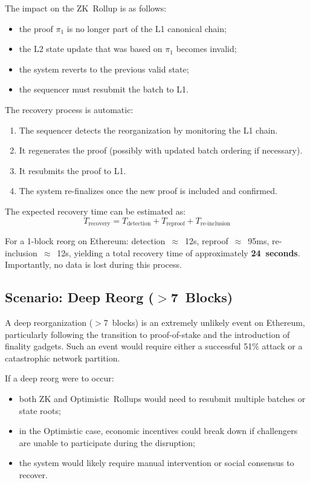 The impact on the ZK~Rollup is as follows:
\begin{itemize}
    \item the proof $\pi_1$ is no longer part of the L1 canonical chain;
    \item the L2 state update that was based on $\pi_1$ becomes invalid;
    \item the system reverts to the previous valid state;
    \item the sequencer must resubmit the batch to L1.
\end{itemize}

The recovery process is automatic:
\begin{enumerate}
    \item The sequencer detects the reorganization by monitoring the L1 chain.
    \item It regenerates the proof (possibly with updated batch ordering if necessary).
    \item It resubmits the proof to L1.
    \item The system re-finalizes once the new proof is included and confirmed.
\end{enumerate}

The expected recovery time can be estimated as:
\begin{equation}
T_{\text{recovery}} = T_{\text{detection}} + T_{\text{reproof}} + T_{\text{re-inclusion}}
\end{equation}

For a 1-block reorg on Ethereum: detection~$\approx$~12s, reproof~$\approx$~95ms, re-inclusion~$\approx$~12s, yielding a total recovery time of approximately \textbf{24~seconds}. Importantly, no data is lost during this process.

\subsection{Scenario: Deep Reorg ($>$7~Blocks)}

A deep reorganization ($>$7~blocks) is an extremely unlikely event on Ethereum, particularly following the transition to proof-of-stake and the introduction of finality gadgets. Such an event would require either a successful 51\% attack or a catastrophic network partition.

If a deep reorg were to occur:
\begin{itemize}
    \item both ZK and Optimistic~Rollups would need to resubmit multiple batches or state roots;
    \item in the Optimistic case, economic incentives could break down if challengers are unable to participate during the disruption;
    \item the system would likely require manual intervention or social consensus to recover.
\end{itemize}

